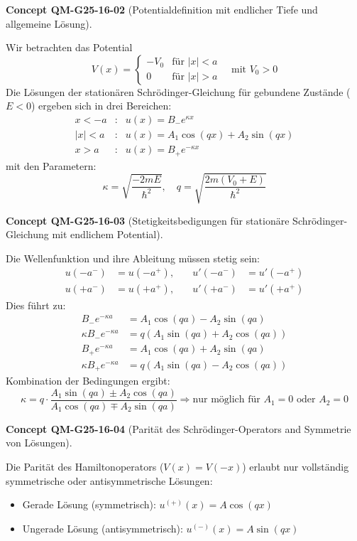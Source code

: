 \documentclass[10pt, letterpaper]{article}
\newcommand{\CustomHeading}[3]{%
  \par\medskip\noindent%
  \textbf{#1 #2} \textnormal{(#3)}.\enskip%
}
\newenvironment{CONC}[2]{\CustomHeading{Concept}{#1}{#2}}{}
\begin{document}
\begin{CONC}{QM-G25-16-02}{Potentialdefinition mit endlicher Tiefe und allgemeine Lösung}
Wir betrachten das Potential
\[
V(x) = \begin{cases}
    -V_0 & \text{für } |x| < a \\
    0    & \text{für } |x| > a
\end{cases}
\quad \text{mit } V_0 > 0
\]
Die Lösungen der stationären Schrödinger-Gleichung für gebundene Zustände ($E<0$) ergeben sich in drei Bereichen:
\[
\begin{array}{rll}
x < -a       & : & u(x) = B_- e^{\kappa x} \\
|x| < a      & : & u(x) = A_1 \cos(qx) + A_2 \sin(qx) \\
x > a        & : & u(x) = B_+ e^{-\kappa x}
\end{array}
\]
mit den Parametern:
\[
\kappa = \sqrt{\frac{-2mE}{\hbar^2}}, \quad q = \sqrt{\frac{2m(V_0 + E)}{\hbar^2}}
\]
\end{CONC}

\begin{CONC}{QM-G25-16-03}{Stetigkeitsbedigungen für stationäre Schrödinger-Gleichung mit endlichem Potential}
Die Wellenfunktion und ihre Ableitung müssen stetig sein:
\[
\begin{aligned}
u(-a^-) &= u(-a^+), &\quad u'(-a^-) &= u'(-a^+) \\
u(+a^-) &= u(+a^+), &\quad u'(+a^-) &= u'(+a^+)
\end{aligned}
\]
Dies führt zu:
\[
\begin{aligned}
B_- e^{-\kappa a} &= A_1 \cos(qa) - A_2 \sin(qa) \\
\kappa B_- e^{-\kappa a} &= q (A_1 \sin(qa) + A_2 \cos(qa)) \\
B_+ e^{-\kappa a} &= A_1 \cos(qa) + A_2 \sin(qa) \\
\kappa B_+ e^{-\kappa a} &= q (A_1 \sin(qa) - A_2 \cos(qa))
\end{aligned}
\]
Kombination der Bedingungen ergibt:
\[
\kappa = q \cdot \frac{A_1 \sin(qa) \pm A_2 \cos(qa)}{A_1 \cos(qa) \mp A_2 \sin(qa)}
\Rightarrow \text{nur möglich für } A_1 = 0 \text{ oder } A_2 = 0
\]
\end{CONC}

\begin{CONC}{QM-G25-16-04}{Parität des Schrödinger-Operators and Symmetrie von Lösungen}
Die Parität des Hamiltonoperators ($V(x) = V(-x)$) erlaubt nur vollständig symmetrische oder antisymmetrische Lösungen:
\begin{itemize}
\item Gerade Lösung (symmetrisch): \( u^{(+)}(x) = A \cos(qx) \)
\item Ungerade Lösung (antisymmetrisch): \( u^{(-)}(x) = A \sin(qx) \)
\end{itemize}
\end{CONC}
\end{document}
